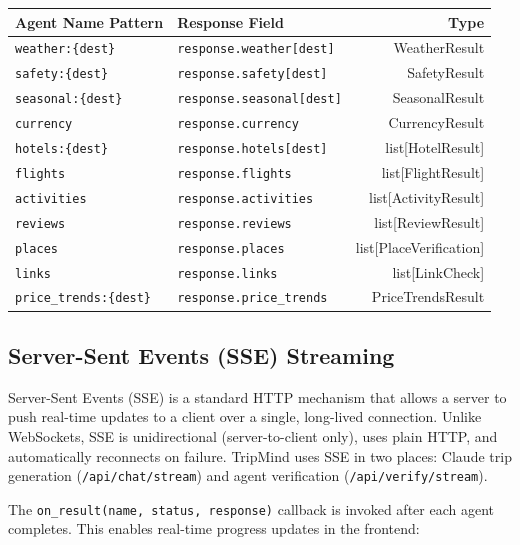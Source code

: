 \documentclass[11pt,a4paper]{article}
\begin{document}
{\small
\begin{tabularx}{\textwidth}{@{}L{3.2cm}L{4.8cm}R@{}}
\toprule
\textbf{Agent Name Pattern} & \textbf{Response Field} & \textbf{Type} \\
\midrule
\texttt{weather:\{dest\}} & \texttt{response.weather[dest]} & WeatherResult \\[3pt]
\texttt{safety:\{dest\}} & \texttt{response.safety[dest]} & SafetyResult \\[3pt]
\texttt{seasonal:\{dest\}} & \texttt{response.seasonal[dest]} & SeasonalResult \\[3pt]
\texttt{currency} & \texttt{response.currency} & CurrencyResult \\[3pt]
\texttt{hotels:\{dest\}} & \texttt{response.hotels[dest]} & list[HotelResult] \\[3pt]
\texttt{flights} & \texttt{response.flights} & list[FlightResult] \\[3pt]
\texttt{activities} & \texttt{response.activities} & list[ActivityResult] \\[3pt]
\texttt{reviews} & \texttt{response.reviews} & list[ReviewResult] \\[3pt]
\texttt{places} & \texttt{response.places} & list[PlaceVerification] \\[3pt]
\texttt{links} & \texttt{response.links} & list[LinkCheck] \\[3pt]
\texttt{price\_trends:\allowbreak\{dest\}} & \texttt{response.price\_trends\allowbreak[dest]} & PriceTrendsResult \\
\bottomrule
\end{tabularx}}

\subsection{Server-Sent Events (SSE) Streaming}

Server-Sent Events (SSE) is a standard HTTP mechanism that allows a server to push real-time updates to a client over a single, long-lived connection. Unlike WebSockets, SSE is unidirectional (server-to-client only), uses plain HTTP, and automatically reconnects on failure. TripMind uses SSE in two places: Claude trip generation (\texttt{/api/chat/stream}) and agent verification (\texttt{/api/verify/stream}).

The \texttt{on\_result(name, status, response)} callback is invoked after each agent completes. This enables real-time progress updates in the frontend:
\end{document}
